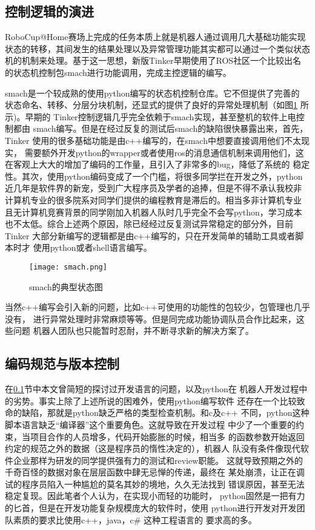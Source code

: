 \subsection{控制逻辑的演进}
\label{sec:logic}

RoboCup@Home赛场上完成的任务本质上就是机器人通过调用几大基础功能实现
状态的转移，其间发生的结果处理以及异常管理功能其实都可以通过一个类似状态
机的机制来处理。基于这一思想，新版Tinker早期使用了ROS社区一个比较出名
的状态机控制包smach进行功能调用，完成主控逻辑的编写。

smach是一个较成熟的使用python编写的状态机控制仓库。它不但提供了完善的
状态命名、转移、分层分块机制，还显式的提供了良好的异常处理机制（如图\ref{fig:smach}
所示)。早期的
Tinker控制逻辑几乎完全依赖于smach实现，甚至整机的软件上电控制都由
smach编写。但是在经过反复的测试后smach的缺陷很快暴露出来，首先，Tinker
使用的很多基础功能是由c++编写的，在smach中想要直接调用他们不太现实，
需要额外开发python的wrapper或者使用ros的消息通信机制来调用他们，这
在客观上大大的增加了编码的工作量，且引入了非常多的bug，降低了系统的
稳定性。其次，使用python编码变成了一个门槛，将很多同学拦在开发之外，python
近几年是软件界的新宠，受到广大程序员及学者的追捧，但是不得不承认我校非
计算机专业的很多院系对同学们提供的编程教育是滞后的。相当多非计算机专业
且无计算机竞赛背景的同学刚加入机器人队时几乎完全不会写python，学习成本
也不太低。综合上述两个原因，除已经经过反复测试异常稳定的部分外，目前Tinker
大部分新编写的逻辑都是由c++编写的，只在开发简单的辅助工具或者脚本时才
使用python或者shell语言编写。

\begin{figure}[h] %
  \centering
  \texttt{[image: smach.png]}
  \caption{smach的典型状态图}
  \label{fig:smach}
\end{figure}

当然c++编写会引入新的问题，比如c++可使用的功能性的包较少，包管理也几乎没有，
进行异常处理时非常麻烦等等。但是同完成功能协调队员合作比起来，这些问题
机器人团队也只能暂时忍耐，并不断寻求新的解决方案了。

\subsection{编码规范与版本控制}

在\ref{sec:logic}节中本文曾简短的探讨过开发语言的问题，以及python在
机器人开发过程中的劣势。事实上除了上述所说的困难外，使用python编写软件
还存在一个比较致命的缺陷，那就是python缺乏严格的类型检查机制。和c及c++
不同，python这种脚本语言缺乏“编译器”这个重要角色。这就导致在开发过程
中少了一个重要的约束，当项目合作的人员增多，代码开始膨胀的时候，相当多
的函数参数开始返回约定的规范之外的数据（这是程序员的惰性决定的），机器人
队没有条件像现代软件企业那样为研发的同学提供强有力的测试和review职能。
这就导致预期之外的千奇百怪的数据对象在层层函数中肆无忌惮的传递，最终在
某处崩溃，让正在调试的程序员陷入一种尴尬的莫名其妙的境地，久久无法找到
错误原因，甚至无法稳定复现。因此笔者个人认为，在实现小而轻的功能时，
python固然是一把有力的匕首，但是在开发功能复杂规模庞大的软件时，使用
python进行开发对开发团队素质的要求比使用c++，java，c\# 这种工程语言的
要求高的多。

